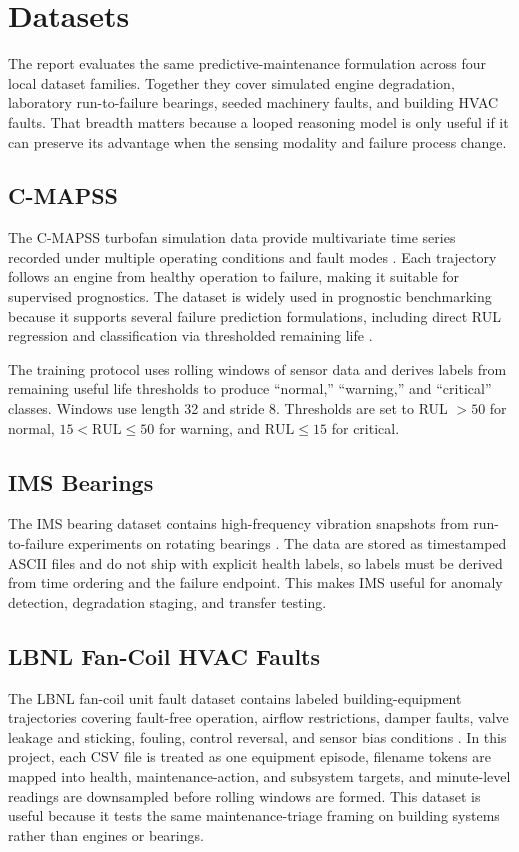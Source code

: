 \section{Datasets}
The report evaluates the same predictive-maintenance formulation across four local dataset families. Together they cover simulated engine degradation, laboratory run-to-failure bearings, seeded machinery faults, and building HVAC faults. That breadth matters because a looped reasoning model is only useful if it can preserve its advantage when the sensing modality and failure process change.

\subsection{C-MAPSS}
The C-MAPSS turbofan simulation data provide multivariate time series recorded under multiple operating conditions and fault modes \cite{Saxena2008CMAPSS}. Each trajectory follows an engine from healthy operation to failure, making it suitable for supervised prognostics. The dataset is widely used in prognostic benchmarking because it supports several failure prediction formulations, including direct RUL regression and classification via thresholded remaining life \cite{Ramasso2014CMAPSS}.

The training protocol uses rolling windows of sensor data and derives labels from remaining useful life thresholds to produce ``normal,'' ``warning,'' and ``critical'' classes. Windows use length 32 and stride 8. Thresholds are set to RUL $> 50$ for normal, $15 < \text{RUL} \leq 50$ for warning, and $\text{RUL} \leq 15$ for critical.

\subsection{IMS Bearings}
The IMS bearing dataset contains high-frequency vibration snapshots from run-to-failure experiments on rotating bearings \cite{NASAIMSBearings}. The data are stored as timestamped ASCII files and do not ship with explicit health labels, so labels must be derived from time ordering and the failure endpoint. This makes IMS useful for anomaly detection, degradation staging, and transfer testing.

\subsection{LBNL Fan-Coil HVAC Faults}
The LBNL fan-coil unit fault dataset contains labeled building-equipment trajectories covering fault-free operation, airflow restrictions, damper faults, valve leakage and sticking, fouling, control reversal, and sensor bias conditions \cite{LBNLFDD2023}. In this project, each CSV file is treated as one equipment episode, filename tokens are mapped into health, maintenance-action, and subsystem targets, and minute-level readings are downsampled before rolling windows are formed. This dataset is useful because it tests the same maintenance-triage framing on building systems rather than engines or bearings.

